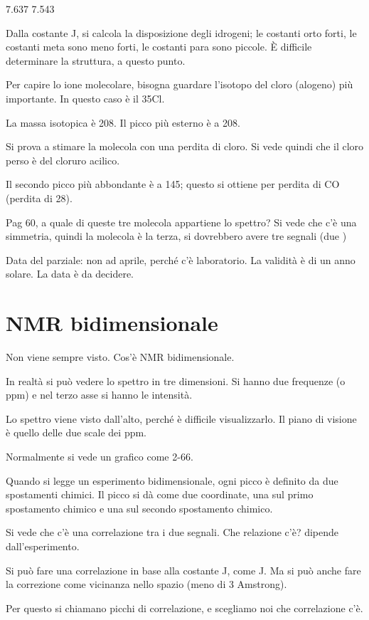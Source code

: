 7.637 7.543

Dalla costante J, si calcola la disposizione degli idrogeni; le costanti
orto forti, le costanti meta sono meno forti, le costanti para sono
piccole. È difficile determinare la struttura, a questo punto.

Per capire lo ione molecolare, bisogna guardare l'isotopo del cloro
(alogeno) più importante. In questo caso è il 35Cl.

La massa isotopica è 208. Il picco più esterno è a 208.

Si prova a stimare la molecola con una perdita di cloro. Si vede quindi
che il cloro perso è del cloruro acilico.

Il secondo picco più abbondante è a 145; questo si ottiene per perdita
di CO (perdita di 28).

Pag 60, a quale di queste tre molecola appartiene lo spettro? Si vede
che c'è una simmetria, quindi la molecola è la terza, si dovrebbero
avere tre segnali (due )

Data del parziale: non ad aprile, perché c'è laboratorio. La validità è
di un anno solare. La data è da decidere.


\section{NMR bidimensionale}

Non viene sempre visto. Cos'è NMR bidimensionale.

In realtà si può vedere lo spettro in tre dimensioni. Si hanno due
frequenze (o ppm) e nel terzo asse si hanno le intensità.

Lo spettro viene visto dall'alto, perché è difficile visualizzarlo. Il
piano di visione è quello delle due scale dei ppm.

Normalmente si vede un grafico come 2-66.

Quando si legge un esperimento bidimensionale, ogni picco è definito da
due spostamenti chimici. Il picco si dà come due coordinate, una sul
primo spostamento chimico e una sul secondo spostamento chimico.

Si vede che c'è una correlazione tra i due segnali. Che relazione c'è?
dipende dall'esperimento.

Si può fare una correlazione in base alla costante J, come J. Ma si può
anche fare la correzione come vicinanza nello spazio (meno di 3
Amstrong).

Per questo si chiamano picchi di correlazione, e scegliamo noi che
correlazione c'è.

